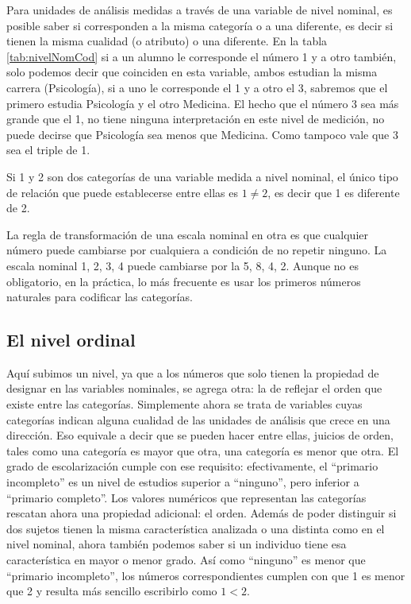 \documentclass[]{book}
\begin{document}
Para unidades de análisis medidas a través de una variable de nivel nominal, es posible saber si corresponden a la misma categoría o a una diferente, es decir si tienen la misma cualidad (o atributo) o una diferente.
En la tabla \ref{tab:nivelNomCod} si a un alumno le corresponde el número 1 y a otro también, solo podemos decir que coinciden en esta variable, ambos estudian la misma carrera (Psicología), si a uno le corresponde el 1 y a otro el 3, sabremos que el primero estudia Psicología y el otro Medicina. El hecho que el número 3 sea más grande que el 1, no tiene ninguna interpretación en este nivel de medición, no puede decirse que Psicología sea menos que Medicina. Como tampoco vale que 3 sea el triple de 1.

Si 1 y 2 son dos categorías de una variable medida a nivel nominal, el único tipo de relación que puede establecerse entre ellas es \(1\neq2\), es decir que 1 es diferente de 2.

La regla de transformación de una escala nominal en otra es que cualquier número puede cambiarse por cualquiera a condición de no repetir ninguno. La escala nominal 1, 2, 3, 4 puede cambiarse por la 5, 8, 4, 2. Aunque no es obligatorio, en la práctica, lo más frecuente es usar los primeros números naturales para codificar las categorías.

\hypertarget{el-nivel-ordinal}{%
\subsection{El nivel ordinal}\label{el-nivel-ordinal}}

Aquí subimos un nivel, ya que a los números que solo tienen la propiedad de designar en las variables nominales, se agrega otra: la de reflejar el orden que existe entre las categorías.
Simplemente ahora se trata de variables cuyas categorías indican alguna cualidad de las unidades de análisis que crece en una dirección. Eso equivale a decir que se pueden hacer entre ellas, juicios de orden, tales como una categoría es mayor que otra, una categoría es menor que otra. El grado de escolarización cumple con ese requisito: efectivamente, el ``primario incompleto'' es un nivel de estudios superior a ``ninguno'', pero inferior a ``primario completo''.
Los valores numéricos que representan las categorías rescatan ahora una propiedad adicional: el orden. Además de poder distinguir si dos sujetos tienen la misma característica analizada o una distinta como en el nivel nominal, ahora también podemos saber si un individuo tiene esa característica en mayor o menor grado. Así como ``ninguno'' es menor que ``primario incompleto'', los números correspondientes cumplen con que 1 es menor que 2 y resulta más sencillo escribirlo como \(1 < 2\).
\end{document}
